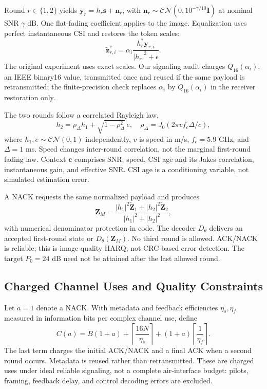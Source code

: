 \documentclass[conference]{IEEEtran}
\begin{document}
Round $r\in\{1,2\}$ yields $\mathbf y_r=h_r\mathbf s+\mathbf n_r$, with
$\mathbf n_r\sim\mathcal{CN}(0,10^{-\gamma/10}\mathbf I)$ at nominal SNR
$\gamma$ dB. One flat-fading coefficient applies to the image. Equalization
uses perfect instantaneous CSI and restores the token scales:
\begin{equation}
 \widetilde{\mathbf z}_{r,i}^{c}
 =\alpha_i\frac{h_r^*\mathbf y_{r,i}}{|h_r|^2+\epsilon}.
 \label{eq:equalize}
\end{equation}
The original experiment uses exact scales. Our signaling audit charges
$Q_{16}(\alpha_i)$, an IEEE binary16 value, transmitted once and reused if the
same payload is retransmitted; the finite-precision check replaces $\alpha_i$
by $Q_{16}(\alpha_i)$ in the receiver restoration only.

The two rounds follow a correlated Rayleigh law,
\begin{equation}
 h_2=\rho_\Delta h_1+\sqrt{1-\rho_\Delta^2}\,e,\quad
 \rho_\Delta=J_0(2\pi v f_c\Delta/c),
 \label{eq:channel}
\end{equation}
where $h_1,e\sim\mathcal{CN}(0,1)$ independently, $v$ is speed in m/s,
$f_c=5.9$ GHz, and $\Delta=1$ ms. Speed changes inter-round correlation,
not the marginal first-round fading law. Context $\mathbf c$ comprises SNR,
speed, CSI age and its Jakes correlation, instantaneous gain, and effective
SNR. CSI age is a conditioning variable, not simulated estimation error.

A NACK requests the same normalized payload and produces
\begin{equation}
 \mathbf Z_M=
 \frac{|h_1|^2\widetilde{\mathbf Z}_1+|h_2|^2\widetilde{\mathbf Z}_2}
 {|h_1|^2+|h_2|^2},
 \label{eq:mrc}
\end{equation}
with numerical denominator protection in code. The decoder $D_\theta$ delivers
an accepted first-round state or $D_\theta(\mathbf Z_M)$. No third round is
allowed. ACK/NACK is reliable; this is image-quality HARQ, not CRC-based
error detection. The target $P_0=24$ dB need not be attained after the last
allowed round.

\subsection{Charged Channel Uses and Quality Constraints}
Let $a=1$ denote a NACK. With metadata and feedback efficiencies
$\eta_s,\eta_f$ measured in information bits per complex channel use, define
\begin{equation}
 C(a)=B(1+a)+\left\lceil\frac{16N}{\eta_s}\right\rceil
       +(1+a)\left\lceil\frac{1}{\eta_f}\right\rceil.
 \label{eq:cost}
\end{equation}
The last term charges the initial ACK/NACK and a final ACK when a second
round occurs. Metadata is reused rather than retransmitted. These are charged
uses under ideal reliable signaling, not a complete air-interface budget:
pilots, framing, feedback delay, and control decoding errors are excluded.
\end{document}
